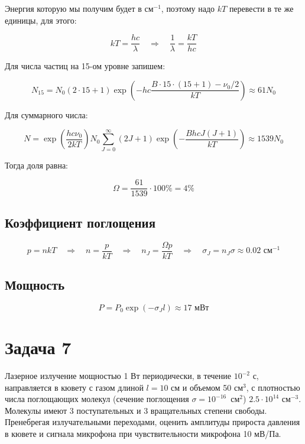 \documentclass[a4paper, 12pt]{article}
\newcommand{\qrq}
{\ensuremath{\quad \Rightarrow \quad}} %
\begin{document}
Энергия которую мы получим будет в см$^{-1}$, поэтому надо $kT$ перевести в те же единицы, для этого:

\begin{equation}
	kT = \frac{h c}{\lambda} \qrq \frac{1}{\lambda} = \frac{kT}{hc}
\end{equation}

Для числа частиц на 15-ом уровне запишем:

\begin{equation}
	N_{15} = N_0 (2 \cdot 15 + 1) \exp\left(-hc\frac{B \cdot 15 \cdot (15 + 1) - \nu_0/2}{kT}\right) \approx 61N_0
\end{equation}

Для суммарного числа:

\begin{equation}
	N = \exp\left(\frac{hc \nu_0}{2 k T}\right) N_0 \sum_{J=0}^\infty (2J  +1) \exp\left(-\frac{BhcJ (J+1)}{kT}\right) \approx 1539 N_0
\end{equation}

Тогда доля равна:

\begin{equation}
	\Omega = \frac{61}{1539} \cdot 100 \% = 4\%
\end{equation}

\subsection*{Коэффициент поглощения}

\begin{equation}
	p = nkT \qrq n = \frac{p}{kT} \qrq n_J =  \frac{\Omega p}{kT} \qrq \sigma_J = n_J \sigma \approx 0.02 \text{ см}^{-1}
\end{equation}

\subsection*{Мощность}

\begin{equation}
	P = P_0 \exp\left(-\sigma_J l\right) \approx 17 \text{ мВт}
\end{equation}

\section*{Задача 7}

Лазерное излучение мощностью 1 Вт периодически, в течение $10^{-2}$ с, направляется в кювету с газом длиной $l = 10$ см и объемом 50 см$^3$, с плотностью числа поглощающих молекул (сечение поглощения $\sigma = 10^{-16}$~см$^2$) $2.5\cdot 10^{14}$ см$^{-3}$. Молекулы имеют 3 поступательных и 3 вращательных степени свободы. Пренебрегая излучательными переходами, оценить амплитуды прироста давления в кювете и сигнала микрофона при чувствительности микрофона 10 мВ/Па.
\end{document}

